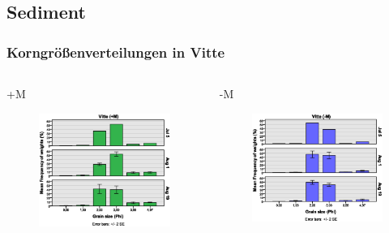 \documentclass[xcolor=dvipsnames]{beamer}
\begin{document}
\subsection{Sediment}

\begin{frame}
\frametitle{Korngrößenverteilungen in Vitte}
\begin{columns}
\begin{column}{5.5cm}
+M
\begin{figure}
\includegraphics[width=\textwidth]{images/grainsize/sediment_im_jahr1.eps}
\end{figure}
\end{column}
\begin{column}{5.5cm}
-M
\begin{figure}
\includegraphics[width=\textwidth]{images/grainsize/sediment_im_jahr2.eps}
\end{figure}
\end{column}
\end{columns}
\end{frame}
\end{document}
